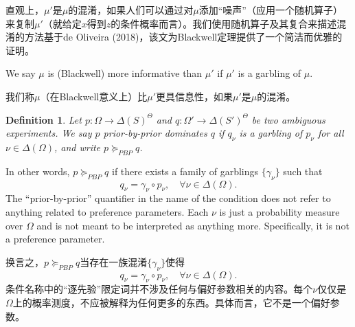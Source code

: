 \documentclass[12pt,a4paper]{article}
\newenvironment{original}
  {\par\vspace{4pt}\noindent\color{black}\ignorespaces}
  {\par\vspace{2pt}}
\newenvironment{translation}
  {\par\vspace{2pt}\noindent\color{myblue}\ignorespaces}
  {\par\vspace{6pt}}
\newtheorem{definition}[theorem]{Definition}
\newcommand{\Delt}{\Delta}
\begin{document}
\begin{translation}
直观上，$\mu'$是$\mu$的混淆，如果人们可以通过对$\mu$添加``噪声''（应用一个随机算子）来复制$\mu'$（就给定$x$得到$z$的条件概率而言）。我们使用随机算子及其复合来描述混淆的方法基于de Oliveira (2018)，该文为Blackwell定理提供了一个简洁而优雅的证明。
\end{translation}

\begin{original}
We say $\mu$ is (Blackwell) more informative than $\mu'$ if $\mu'$ is a garbling of $\mu$.
\end{original}

\begin{translation}
我们称$\mu$（在Blackwell意义上）比$\mu'$更具信息性，如果$\mu'$是$\mu$的混淆。
\end{translation}

\begin{definition}
Let $p:\Omega\to\Delt(S)^{\Theta}$ and $q:\Omega'\to\Delt(S')^{\Theta}$ be two ambiguous experiments. We say $p$ prior-by-prior dominates $q$ if $q_{\nu}$ is a garbling of $p_{\nu}$ for all $\nu\in\Delt(\Omega)$, and write $p\succeq_{PBP} q$.
\end{definition}

\begin{original}
In other words, $p\succeq_{PBP} q$ if there exists a family of garblings $\{\gamma_{\nu}\}$ such that
\begin{equation}
    q_{\nu} = \gamma_{\nu}\circ p_{\nu}, \quad \forall\nu\in\Delt(\Omega). \label{eq:pbp}
\end{equation}
The ``prior-by-prior'' quantifier in the name of the condition does not refer to anything related to preference parameters. Each $\nu$ is just a probability measure over $\Omega$ and is not meant to be interpreted as anything more. Specifically, it is not a preference parameter.
\end{original}

\begin{translation}
换言之，$p\succeq_{PBP} q$当存在一族混淆$\{\gamma_{\nu}\}$使得
\begin{equation}
    q_{\nu} = \gamma_{\nu}\circ p_{\nu}, \quad \forall\nu\in\Delt(\Omega). \label{eq:pbp}
\end{equation}
条件名称中的``逐先验''限定词并不涉及任何与偏好参数相关的内容。每个$\nu$仅仅是$\Omega$上的概率测度，不应被解释为任何更多的东西。具体而言，它不是一个偏好参数。
\end{translation}
\end{document}
